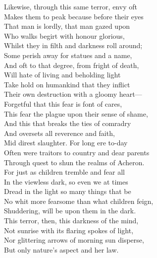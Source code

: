 Likewise, through this same terror, envy oft\\
Makes them to peak because before their eyes\\
That man is lordly, that man gazed upon\\
Who walks begirt with honour glorious,\\
Whilst they in filth and darkness roll around;\\
Some perish away for statues and a name,\\
And oft to that degree, from fright of death,\\
Will hate of living and beholding light\\
Take hold on humankind that they inflict\\
Their own destruction with a gloomy heart—\\
Forgetful that this fear is font of cares,\\
This fear the plague upon their sense of shame,\\
And this that breaks the ties of comradry\\
And oversets all reverence and faith,\\
Mid direst slaughter. For long ere to-day\\
Often were traitors to country and dear parents\\
Through quest to shun the realms of Acheron.\\
For just as children tremble and fear all\\
In the viewless dark, so even we at times\\
Dread in the light so many things that be\\
No whit more fearsome than what children feign,\\
Shuddering, will be upon them in the dark.\\
This terror, then, this darkness of the mind,\\
Not sunrise with its flaring spokes of light,\\
Nor glittering arrows of morning sun disperse,\\
But only nature's aspect and her law.


